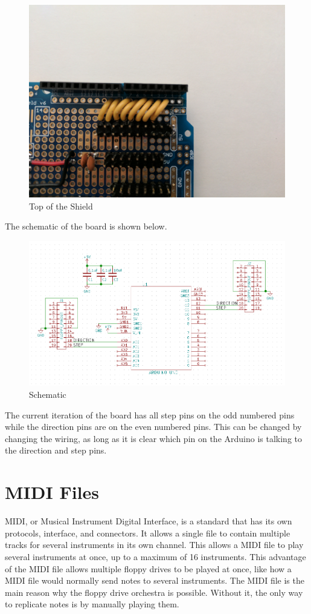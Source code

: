 \documentclass[11pt, a4paper]{report}
\begin{document}
\begin{figure}[H]
\hspace*{-2cm}    
    \centering
    \includegraphics[width=.5\textwidth]{TOP2.jpg}
    \caption{Top of the Shield}
    \label{fig:TOP2}
\end{figure}


The schematic of the board is shown below. 

\begin{figure}[H]
\hspace*{-2cm}    
    \centering
    \includegraphics[width=\textwidth]{schematic.png}
    \caption{Schematic}
    \label{fig:SCHEMATIC}
\end{figure}

The current iteration of the board has all step pins on the odd numbered pins while the direction pins are on the even numbered pins. This can be changed by changing the wiring, as long as it is clear which pin on the Arduino is talking to the direction and step pins.

\chapter{MIDI Files}

MIDI, or Musical Instrument Digital Interface, is a standard that has its own protocols, interface, and connectors. It allows a single file to contain multiple tracks for several instruments in its own channel. This allows a MIDI file to play several instruments at once, up to a maximum of 16 instruments. This advantage of the MIDI file allows multiple floppy drives to be played at once, like how a MIDI file would normally send notes to several instruments. The MIDI file is the main reason why the floppy drive orchestra is possible. Without it, the only way to replicate notes is by manually playing them. 
\end{document}

